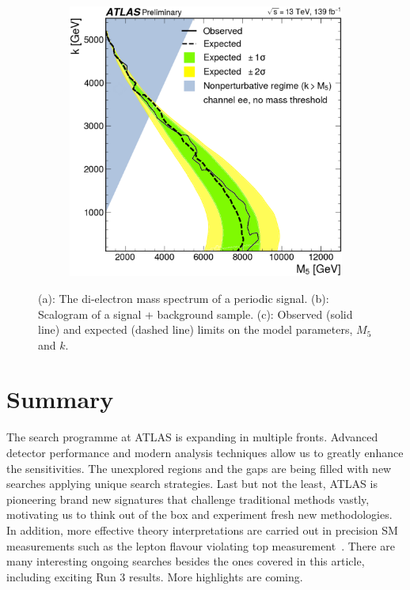 \documentclass{moriond}
\begin{document}
\begin{figure}[htp]
\begin{subfigure}[b]{0.30\textwidth}
         \caption{}
         \label{fig:shape}
     \end{subfigure}
     \begin{subfigure}[b]{0.30\textwidth}
         \centering
         \includegraphics[width=\textwidth]{periodic}
         \caption{}
         \label{fig:perlimits}
     \end{subfigure}
        \caption{(a): The di-electron mass spectrum of a periodic signal. (b): Scalogram of a signal + background sample. (c): Observed (solid line) and expected (dashed line) limits on the model parameters, $M_{5}$ and $k$\protect\cite{period}.}
        \label{fig:periodic}
\end{figure}

\section{Summary}

The search programme at ATLAS is expanding in multiple fronts. Advanced
detector performance and modern analysis techniques allow us to greatly enhance
the sensitivities. The unexplored regions and the gaps are being filled with
new searches applying unique search strategies. Last but not the least, ATLAS
is pioneering brand new signatures that challenge traditional methods vastly,
motivating us to think out of the box and experiment fresh new methodologies.
In addition, more effective theory interpretations are carried out in precision
SM measurements such as the lepton flavour violating top
measurement~\cite{top}. There are many interesting ongoing searches besides the
ones covered in this article, including exciting Run 3 results. More highlights
are coming.       
\end{document}

